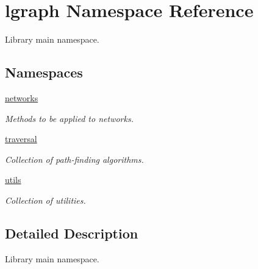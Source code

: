 \hypertarget{namespacelgraph}{}\section{lgraph Namespace Reference}
\label{namespacelgraph}


Library main namespace.  


\subsection*{Namespaces}
\begin{DoxyCompactItemize}
\item 
 \hyperlink{namespacelgraph_1_1networks}{networks}
\begin{DoxyCompactList}\small\item\em Methods to be applied to networks. \end{DoxyCompactList}\item 
 \hyperlink{namespacelgraph_1_1traversal}{traversal}
\begin{DoxyCompactList}\small\item\em Collection of path-\/finding algorithms. \end{DoxyCompactList}\item 
 \hyperlink{namespacelgraph_1_1utils}{utils}
\begin{DoxyCompactList}\small\item\em Collection of utilities. \end{DoxyCompactList}\end{DoxyCompactItemize}


\subsection{Detailed Description}
Library main namespace. 